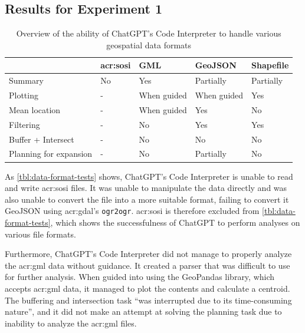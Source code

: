 \subsection{Results for Experiment 1}\label{subsec:experiment-1-results}

\begin{table}
    \centering
    \begin{tabular}{l|p{}p{}p{}p{}}
        \toprule
                               & \textbf{\acrshort{acr:sosi}} & \textbf{GML} & \textbf{GeoJSON} & \textbf{Shapefile} \\
        \midrule
        Summary                & No                           & Yes          & Partially        & Partially          \\
        Plotting               & -                            & When guided  & When guided      & Yes                \\
        Mean location          & -                            & When guided  & Yes              & No                 \\
        Filtering              & -                            & No           & Yes              & Yes                \\
        Buffer + Intersect     & -                            & No           & No               & No                 \\
        Planning for expansion & -                            & No           & Partially        & No                 \\
        \bottomrule
    \end{tabular}
    \caption{Overview of the ability of ChatGPT's Code Interpreter to handle various geospatial data formats}
    \label{tbl:data-format-tests}
\end{table}

As \autoref{tbl:data-format-tests} shows, ChatGPT's Code Interpreter is unable to read and write \acrshort{acr:sosi} files. It was unable to manipulate the data directly and was also unable to convert the file into a more suitable format, failing to convert it GeoJSON using \acrshort{acr:gdal}'s \texttt{ogr2ogr}. \acrshort{acr:sosi} is therefore excluded from \autoref{tbl:data-format-tests}, which shows the successfulness of ChatGPT to perform analyses on various file formats.

Furthermore, ChatGPT's Code Interpreter did not manage to properly analyze the \acrshort{acr:gml} data without guidance. It created a parser that was difficult to use for further analysis. When guided into using the GeoPandas library, which accepts \acrshort{acr:gml} data, it managed to plot the contents and calculate a centroid. The buffering and intersection task \enquote{was interrupted due to its time-consuming nature}, and it did not make an attempt at solving the planning task due to inability to analyze the \acrshort{acr:gml} files.

